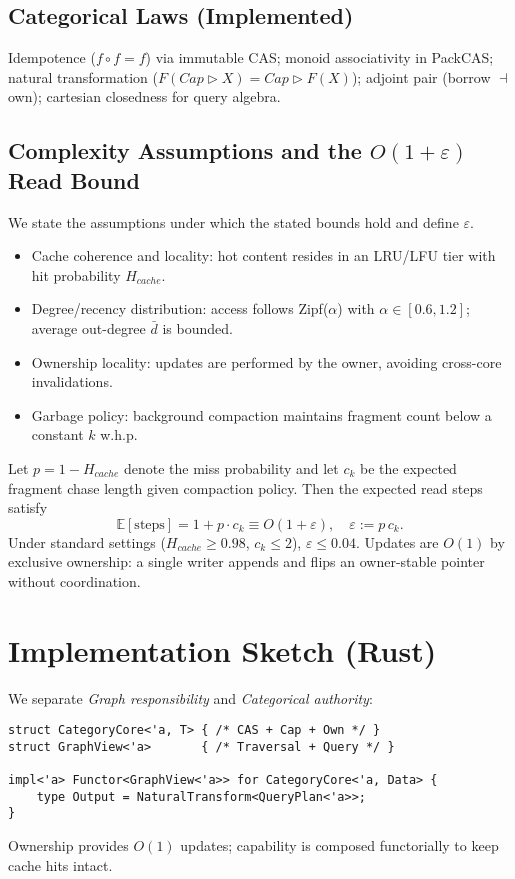 \documentclass[10pt]{article}
\begin{document}
\subsection{Categorical Laws (Implemented)}
Idempotence ($f\circ f=f$) via immutable CAS; monoid associativity in PackCAS;
natural transformation ($F(Cap\triangleright X)=Cap\triangleright F(X)$);
adjoint pair (borrow $\dashv$ own); cartesian closedness for query algebra.

\subsection{Complexity Assumptions and the $O(1{+}\varepsilon)$ Read Bound}
We state the assumptions under which the stated bounds hold and define $\varepsilon$.
\begin{itemize}[nosep]
    \item Cache coherence and locality: hot content resides in an LRU/LFU tier with hit probability $H_{cache}$.
    \item Degree/recency distribution: access follows Zipf($\alpha$) with $\alpha\in[0.6,1.2]$; average out-degree $\bar d$ is bounded.
    \item Ownership locality: updates are performed by the owner, avoiding cross-core invalidations.
    \item Garbage policy: background compaction maintains fragment count below a constant $k$ w.h.p.
\end{itemize}
Let $p=1-H_{cache}$ denote the miss probability and let $c_k$ be the expected fragment chase length given compaction policy. Then the expected read steps satisfy
\[
\mathbb{E}[\text{steps}] = 1 + p\cdot c_k \equiv O(1{+}\varepsilon),\quad \varepsilon := p\,c_k.
\]
Under standard settings ($H_{cache}{\ge}0.98$, $c_k{\le}2$), $\varepsilon\le0.04$. Updates are $O(1)$ by exclusive ownership: a single writer appends and flips an owner-stable pointer without coordination.

\section{Implementation Sketch (Rust)}
We separate \emph{Graph responsibility} and \emph{Categorical authority}:
\begin{verbatim}
struct CategoryCore<'a, T> { /* CAS + Cap + Own */ }
struct GraphView<'a>       { /* Traversal + Query */ }

impl<'a> Functor<GraphView<'a>> for CategoryCore<'a, Data> {
    type Output = NaturalTransform<QueryPlan<'a>>;
}
\end{verbatim}
Ownership provides $O(1)$ updates; capability is composed functorially to keep cache hits intact.
\end{document}

